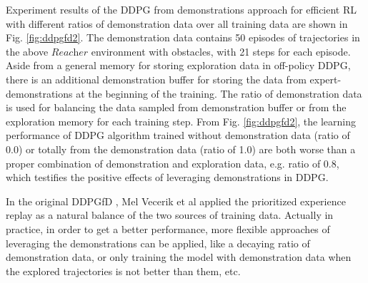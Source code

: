 \documentclass{article}
\begin{document}
Experiment results of the DDPG from demonstrations approach for efficient RL with different ratios of demonstration data over all training data are shown in Fig. \ref{fig:ddpgfd2}. The demonstration data contains 50 episodes of trajectories in the above $\textit{Reacher}$ environment with obstacles, with 21 steps for each episode. Aside from a general memory for storing exploration data in off-policy DDPG, there is an additional demonstration buffer for storing the data from expert-demonstrations at the beginning of the training. The ratio of demonstration data is used for balancing the data sampled from demonstration buffer or from the exploration memory for each training step. From Fig. \ref{fig:ddpgfd2}, the learning performance of DDPG algorithm trained without demonstration data (ratio of 0.0) or totally from the demonstration data (ratio of 1.0) are both worse than a proper combination of demonstration and exploration data, e.g. ratio of 0.8, which testifies the positive effects of leveraging demonstrations in DDPG.

In the original DDPGfD \cite{vevcerik2017leveraging}, Mel Vecerik et al applied the prioritized experience replay as a natural balance of the two sources of training data. Actually in practice, in order to get a better performance, more flexible approaches of leveraging the demonstrations can be applied, like a decaying ratio of demonstration data, or only training the model with demonstration data when the explored trajectories is not better than them, etc.
\end{document}
